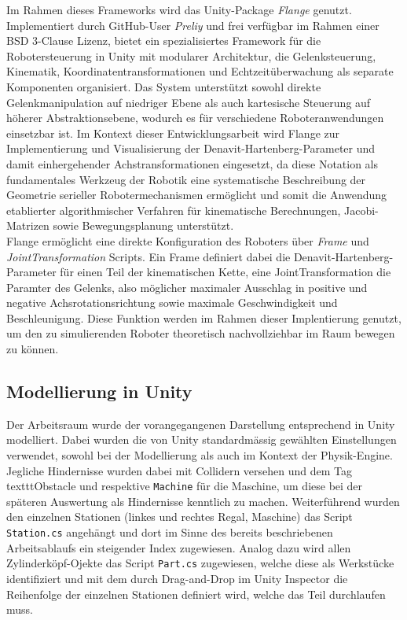 Im Rahmen dieses Frameworks wird das Unity-Package \textit{Flange} genutzt.
Implementiert durch GitHub-User \textit{Preliy} und frei verfügbar im Rahmen
einer BSD 3-Clause Lizenz, bietet ein spezialisiertes Framework für die
Robotersteuerung in Unity mit modularer Architektur, die Gelenksteuerung,
Kinematik, Koordinatentransformationen und Echtzeitüberwachung als separate
Komponenten organisiert. Das System unterstützt sowohl direkte
Gelenkmanipulation auf niedriger Ebene als auch kartesische Steuerung auf
höherer Abstraktionsebene, wodurch es für verschiedene Roboteranwendungen
einsetzbar ist. Im Kontext dieser Entwicklungsarbeit
wird Flange zur Implementierung und Visualisierung der
Denavit-Hartenberg-Parameter und damit einhergehender Achstransformationen
eingesetzt, da diese Notation als fundamentales Werkzeug der Robotik eine
systematische Beschreibung der Geometrie serieller Robotermechanismen ermöglicht
und somit die Anwendung etablierter algorithmischer Verfahren für kinematische
Berechnungen, Jacobi-Matrizen sowie Bewegungsplanung
unterstützt.\\

\noindent
Flange ermöglicht eine direkte Konfiguration des Roboters über \textit{Frame}
und \textit{JointTransformation} Scripts. Ein Frame definiert dabei die
Denavit-Hartenberg-Parameter für einen Teil der kinematischen Kette, eine
JointTransformation die Paramter des Gelenks, also möglicher maximaler Ausschlag
in positive und negative Achsrotationsrichtung sowie maximale Geschwindigkeit
und Beschleunigung. Diese Funktion werden im Rahmen dieser Implentierung
genutzt, um den zu simulierenden Roboter theoretisch nachvollziehbar im Raum
bewegen zu können.

\subsection{Modellierung in Unity}
Der Arbeitsraum wurde der vorangegangenen Darstellung entsprechend in Unity
modelliert. Dabei wurden die von Unity standardmässig gewählten Einstellungen
verwendet, sowohl bei der Modellierung als auch im Kontext der
Physik-Engine. Jegliche Hindernisse wurden dabei mit Collidern versehen und dem
Tag texttt{Obstacle} und respektive \texttt{Machine} für die Maschine, um diese
bei der späteren Auswertung als Hindernisse kenntlich zu machen. Weiterführend
wurden den einzelnen Stationen (linkes und rechtes Regal, Maschine) das Script
\texttt{Station.cs} angehängt und dort im Sinne des bereits beschriebenen
Arbeitsablaufs ein steigender Index zugewiesen. Analog dazu wird allen
Zylinderköpf-Ojekte das Script \texttt{Part.cs} zugewiesen, welche diese als
Werkstücke identifiziert und mit dem durch Drag-and-Drop im Unity Inspector die
Reihenfolge der einzelnen Stationen definiert wird, welche das Teil durchlaufen
muss.\\

